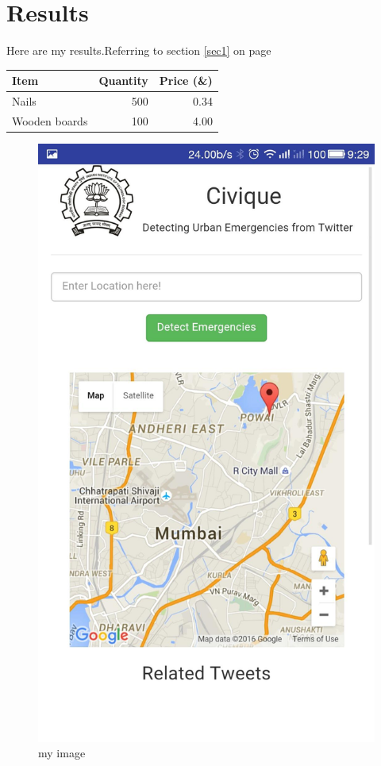 \documentclass[a4paper, 10pt, fullpage]{article}
\begin{document}
\section{Results}
Here are my {\huge results}.Referring to section \ref{sec1} on page 
\pageref{sec1}

\begin{tabular}{l|r|r}
Item & Quantity & Price (\&) \\
\hline
Nails & 500 & 0.34 \\
Wooden boards & 100 & 4.00 \\

\end{tabular}

\newpage
\begin{figure}[t]
\includegraphics[scale=0.1]{1.jpg}
\caption{my image}
\end{figure}
\end{document}
